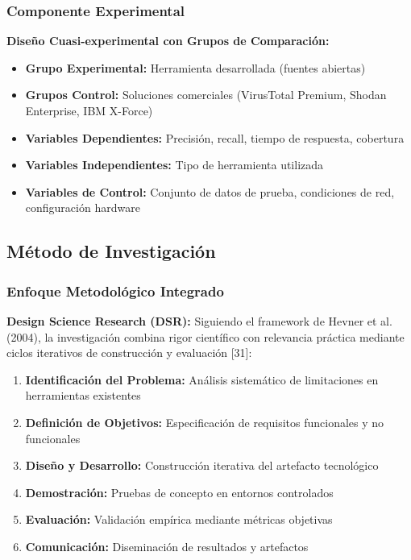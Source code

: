 \subsubsection{Componente Experimental}
\textbf{Diseño Cuasi-experimental con Grupos de Comparación:}
\begin{itemize}
    \item \textbf{Grupo Experimental:} Herramienta desarrollada (fuentes abiertas)
    \item \textbf{Grupos Control:} Soluciones comerciales (VirusTotal Premium, Shodan Enterprise, IBM X-Force)
    \item \textbf{Variables Dependientes:} Precisión, recall, tiempo de respuesta, cobertura
    \item \textbf{Variables Independientes:} Tipo de herramienta utilizada
    \item \textbf{Variables de Control:} Conjunto de datos de prueba, condiciones de red, configuración hardware
\end{itemize}

\subsection{Método de Investigación}

\subsubsection{Enfoque Metodológico Integrado}

\textbf{Design Science Research (DSR):}
Siguiendo el framework de Hevner et al. (2004), la investigación combina rigor científico con relevancia práctica mediante ciclos iterativos de construcción y evaluación [31]:

\begin{enumerate}
    \item \textbf{Identificación del Problema:} Análisis sistemático de limitaciones en herramientas existentes
    \item \textbf{Definición de Objetivos:} Especificación de requisitos funcionales y no funcionales
    \item \textbf{Diseño y Desarrollo:} Construcción iterativa del artefacto tecnológico
    \item \textbf{Demostración:} Pruebas de concepto en entornos controlados
    \item \textbf{Evaluación:} Validación empírica mediante métricas objetivas
    \item \textbf{Comunicación:} Diseminación de resultados y artefactos
\end{enumerate}

